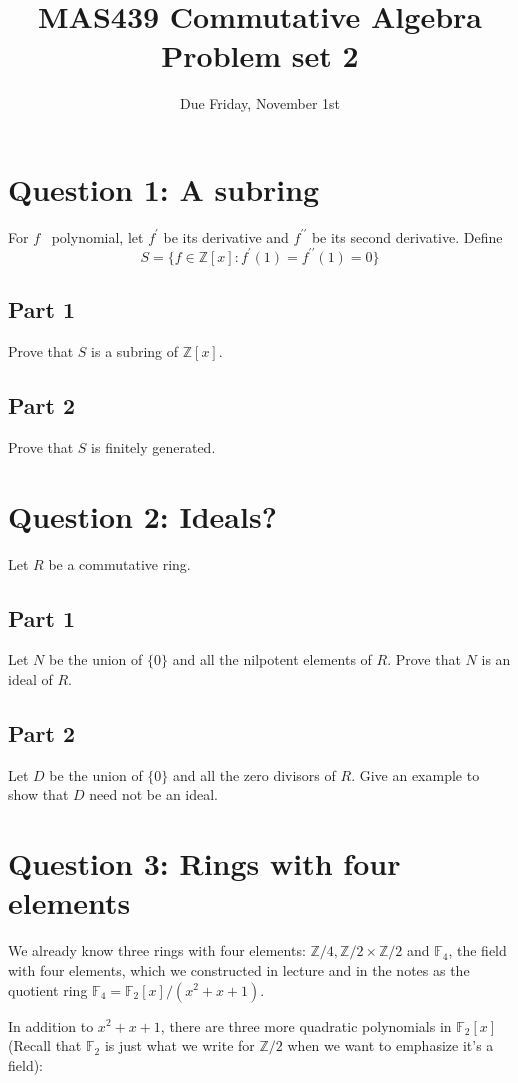 \documentclass{amsart}[12pt]
\title{MAS439 Commutative Algebra \\ Problem set 2}
\author{Due Friday, November 1st}
\begin{document}
\maketitle
\section*{Question 1: A subring}
For $f$ \ polynomial, let $f^\prime$ be its derivative and $f^{\prime\prime}$ be its second derivative.  Define
$$S=\{f\in\mathbb{Z}[x] : f^\prime(1)=f^{\prime\prime}(1)=0\}$$
\subsection*{Part 1}
Prove that $S$ is a subring of $\mathbb{Z}[x]$.
\subsection*{Part 2} Prove that $S$ is finitely generated.

\section*{Question 2: Ideals?}
Let $R$ be a commutative ring.
\subsection*{Part 1} Let $N$ be the union of $\{0\}$ and all the nilpotent elements of $R$.  Prove that $N$ is an ideal of $R$.
\subsection*{Part 2} Let $D$ be the union of $\{0\}$ and all the zero divisors of $R$.  Give an example to show that $D$ need not be an ideal.

\section*{Question 3: Rings with four elements}
We already know three rings with four elements: $\mathbb{Z}/4, \mathbb{Z}/2\times\mathbb{Z}/2$ and $\mathbb{F}_4$, the field with four elements, which we constructed in lecture and in the notes as the quotient ring $\mathbb{F}_4=\mathbb{F}_2[x]/(x^2+x+1)$.

In addition to $x^2+x+1$, there are three more quadratic polynomials in $\mathbb{F}_2[x]$ (Recall that $\mathbb{F}_2$ is just what we write for $\mathbb{Z}/2$ when we want to emphasize it's a field):
\end{document}
